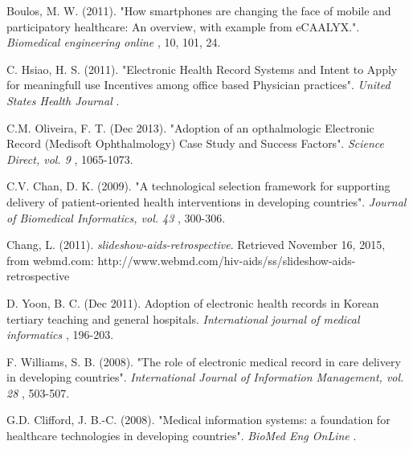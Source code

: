 \documentclass[12pt]{article}
\begin{document}
\vspace{\baselineskip}

\vspace{\baselineskip}

\vspace{\baselineskip}

\vspace{\baselineskip}

\vspace{\baselineskip}
\par

Boulos, M. W. (2011). "How smartphones are changing the face of mobile and participatory healthcare: An overview, with example from eCAALYX.". \textit{Biomedical engineering online} , 10, 101, 24.\par

C. Hsiao, H. S. (2011). "Electronic Health Record Systems and Intent to Apply for meaningfull use Incentives among office based Physician practices". \textit{United States Health Journal} .\par

C.M. Oliveira, F. T. (Dec 2013). "Adoption of an opthalmologic Electronic Record (Medisoft Ophthalmology) Case Study and Success Factors". \textit{Science Direct, vol. 9} , 1065-1073.\par

C.V. Chan, D. K. (2009). "A technological selection framework for supporting delivery of patient-oriented health interventions in developing countries". \textit{Journal of Biomedical Informatics, vol. 43} , 300-306.\par

Chang, L. (2011). \textit{slideshow-aids-retrospective}. Retrieved November 16, 2015, from webmd.com: http://www.webmd.com/hiv-aids/ss/slideshow-aids-retrospective\par

D. Yoon, B. C. (Dec 2011). Adoption of electronic health records in Korean tertiary teaching and general hospitals. \textit{International journal of medical informatics} , 196-203.\par

F. Williams, S. B. (2008). "The role of electronic medical record in care delivery in developing countries". \textit{International Journal of Information Management, vol. 28} , 503-507.\par

G.D. Clifford, J. B.-C. (2008). "Medical information systems: a foundation for healthcare technologies in developing countries". \textit{BioMed Eng OnLine} .\par
\end{document}

